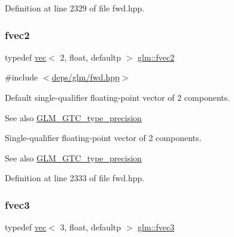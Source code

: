 Definition at line 2329 of file fwd.\+hpp.

\mbox{\label{group__gtc__type__precision_gaabc3d7a259968a12108c052ff9265148}} 
\subsubsection{\texorpdfstring{fvec2}{fvec2}}
{\footnotesize\ttfamily typedef \hyperlink{structglm_1_1vec}{vec}$<$ 2, float, defaultp $>$ \hyperlink{group__gtc__type__precision_gaabc3d7a259968a12108c052ff9265148}{glm\+::fvec2}}



{\ttfamily \#include $<$\hyperlink{fwd_8hpp}{deps/glm/fwd.\+hpp}$>$}

Default single-\/qualifier floating-\/point vector of 2 components. \begin{DoxySeeAlso}{See also}
\hyperlink{group__gtc__type__precision}{G\+L\+M\+\_\+\+G\+T\+C\+\_\+type\+\_\+precision}
\end{DoxySeeAlso}
Single-\/qualifier floating-\/point vector of 2 components. \begin{DoxySeeAlso}{See also}
\hyperlink{group__gtc__type__precision}{G\+L\+M\+\_\+\+G\+T\+C\+\_\+type\+\_\+precision} 
\end{DoxySeeAlso}


Definition at line 2333 of file fwd.\+hpp.

\mbox{\label{group__gtc__type__precision_gaf7cdc93898ec0c11f1cff54bd72d022b}} 
\subsubsection{\texorpdfstring{fvec3}{fvec3}}
{\footnotesize\ttfamily typedef \hyperlink{structglm_1_1vec}{vec}$<$ 3, float, defaultp $>$ \hyperlink{group__gtc__type__precision_gaf7cdc93898ec0c11f1cff54bd72d022b}{glm\+::fvec3}}



